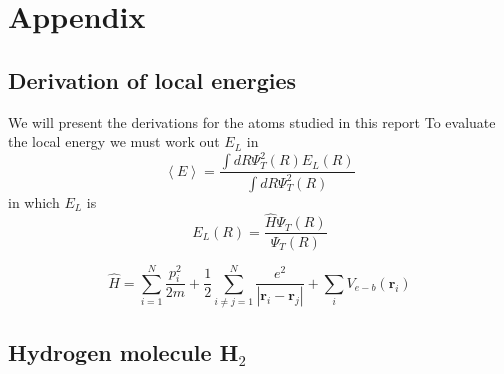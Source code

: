 \documentclass{article}
\begin{document}

{}





\section{Appendix}
\subsection{Derivation of local energies}
We will present the derivations for the atoms studied in this report
To evaluate the local energy we must work out $E_L$ in 
\begin{equation}
 \left\langle E \right\rangle = \frac{\int dR \Psi_T^2(R)E_L(R)}{\int dR \Psi_T^2(R)}
\end{equation}
in which $E_L$ is
\begin{equation}
 E_L(R)=\frac{\hat{H}\Psi_T(R)}{\Psi_T(R)}
\end{equation}

\begin{equation}
 \hat{H}=\sum_{i=1}^N \frac{p_i^2}{2m}+\frac12 \sum_{i\ne j=1}^N \frac{e^2}{\left| \mathbf{r}_i -\mathbf{r}_j \right|}+\sum_i V_{e-b}(\mathbf{r}_i)
\end{equation}

\subsection{Hydrogen molecule H$_2$}
\end{document}
